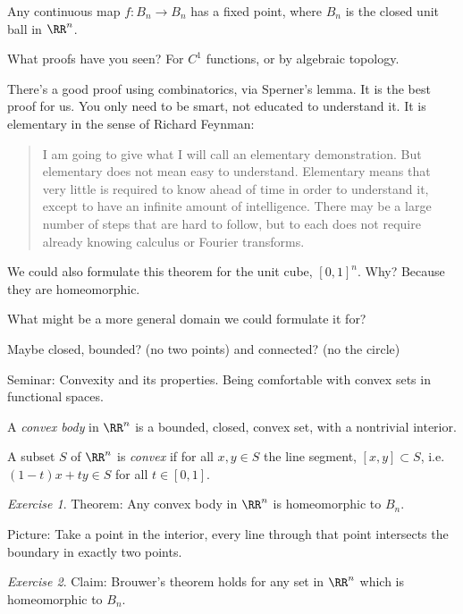 \documentclass{article}
\theoremstyle{remark}
\newtheorem{exercise}{Exercise}
\begin{document}
\begin{theorem}[Brouwer]
    Any continuous map $f:B_n\to B_n$
    has a fixed point, where $B_n$ is the closed unit ball
    in $\RR^n$. 
\end{theorem}

What proofs have you seen? For $C^1$ functions, or by algebraic
topology.

There's a good proof using combinatorics, via Sperner's lemma.
It is the best proof for us. 
You only need to be smart, not educated to understand it.
It is elementary in the sense of Richard Feynman:
\begin{quote}
    I am going to give what I will call an elementary
    demonstration. But elementary does not mean easy
    to understand. Elementary means that very little 
    is required to know ahead of time in order to understand
    it, except to have an infinite amount of intelligence.
    There may be a large number of steps that are hard 
    to follow, but to each does not require already knowing
    calculus or Fourier transforms.
\end{quote}

We could also formulate this theorem for the unit cube,
$[0,1]^n$. Why? Because they are homeomorphic.

What might be a more general domain we could formulate it for?

Maybe closed, bounded? (no two points) and connected?
(no the circle) 

Seminar: Convexity and its properties. Being comfortable with
convex sets in functional spaces.

\begin{definition}
    A \emph{convex body} in $\RR^n$ is a bounded, closed, convex set,
    with a nontrivial interior.

    A subset $S$ of $\RR^n$ is \emph{convex} if for all 
    $x,y\in S$ the line segment, $[x,y]\subset S$, 
    i.e. $(1-t)x+ty \in S$ for all $t\in [0,1]$.
\end{definition}


\begin{exercise}
    Theorem: Any convex body in $\RR^n$ is homeomorphic to 
    $B_n$.

    Picture: Take a point in the interior, every line through
    that point intersects the boundary in exactly two points.
\end{exercise}

\begin{exercise}
    Claim: Brouwer's theorem holds for any set in $\RR^n$
    which is homeomorphic to $B_n$.
\end{exercise}
\end{document}
